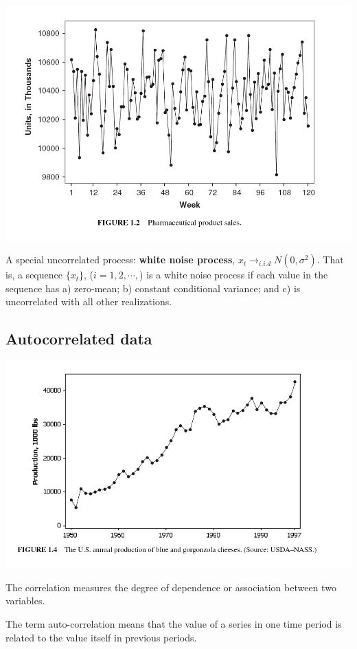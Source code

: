 \documentclass[
]{book}
\begin{document}
\begin{center}\includegraphics[width=0.8\linewidth]{img11/w11-Figure02} \end{center}

A special uncorrelated process: \textbf{white noise process}, \(x_t \to_{i.i.d} N(0, \sigma^2)\). That is, a sequence \(\{x_t\}\), (\(i = 1, 2, \cdots,\)) is a white noise process if each value in the sequence has a) zero-mean; b) constant conditional variance; and c) is uncorrelated with all other realizations.

\hypertarget{autocorrelated-data}{%
\subsection{Autocorrelated data}\label{autocorrelated-data}}

\begin{center}\includegraphics[width=0.8\linewidth]{img11/w11-Figure03} \end{center}

The correlation measures the degree of dependence or association between two variables.

The term auto-correlation means that the value of a series in one time period is related to the value itself in previous periods.
\end{document}
